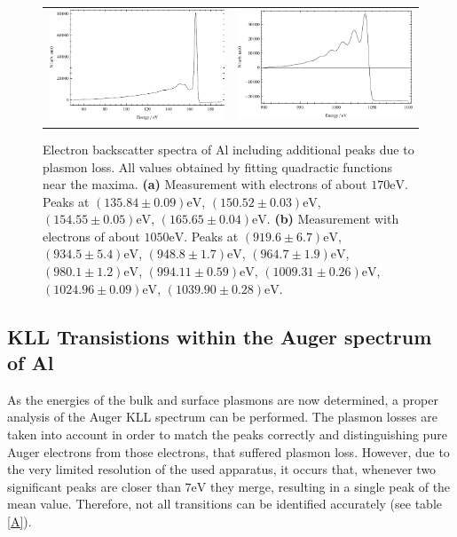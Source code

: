 \documentclass[a4paper]{scrartcl}
\numberwithin{equation}{section}
\numberwithin{figure}{section}
\numberwithin{table}{section}
\begin{document}
\begin{figure}[!h]
        \begin{center}
		  \begin{tabular}{l r}
        		\includegraphics[width=0.48\linewidth]{pic/plasmon200.pdf}
			&
				\includegraphics[width=0.48\linewidth]{pic/plasmon1k.pdf}
        \end{tabular}
        \end{center}
        \caption[eel]{
			\small Electron backscatter spectra of Al including additional peaks due to plasmon loss. All values obtained by fitting quadractic functions near the maxima.
			\textbf{(a)} Measurement with electrons of about $170\text{eV}$. Peaks at $(135.84\pm 0.09)\text{eV}$, $(150.52\pm 0.03)\text{eV}$, $(154.55\pm 0.05)\text{eV}$, $(165.65\pm 0.04)\text{eV}$.
			\textbf{(b)} Measurement with electrons of about $1050\text{eV}$. Peaks at $(919.6\pm 6.7)\text{eV}$, $(934.5\pm 5.4)\text{eV}$, $(948.8\pm 1.7)\text{eV}$, $(964.7\pm 1.9)\text{eV}$, $(980.1\pm 1.2)\text{eV}$, $(994.11\pm 0.59)\text{eV}$, $(1009.31\pm 0.26)\text{eV}$, $(1024.96\pm 0.09)\text{eV}$, $(1039.90\pm 0.28)\text{eV}$.
        }
        \label{fig:plas}
\end{figure} 

\subsection{KLL Transistions within the Auger spectrum of Al}
As the energies of the bulk and surface plasmons are now determined, a proper analysis of the Auger KLL spectrum can be performed. The plasmon losses are taken into account in order to match the peaks correctly and distinguishing pure Auger electrons from those electrons, that suffered plasmon loss. However, due to the very limited resolution of the used apparatus, it occurs that, whenever two significant peaks are closer than $7\text{eV}$ they merge, resulting in a single peak of the mean value. Therefore, not all transitions can be identified accurately (see table \ref{A}).
\end{document}
